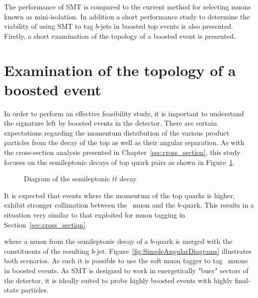 The performance of SMT is compared to the current method for selecting muons known as mini-isolation. In addition a short performance study to determine the viability of using SMT to tag $b$-jets in boosted top events is also presented. Firstly, a short examination of the topology of a boosted event is presented.

\section{Examination of the topology of a boosted event}

In order to perform an effective feasibility study, it is important to understand the signature left by boosted events in the detector. There are certain expectations regarding the momentum distribution of the various product particles from the decay of the top as well as their angular separation. As with the cross-section analysis presented in Chapter~\ref{sec:cross_section}, this study focuses on the semileptonic decays of top quark pairs as shown in Figure~\ref{fig:BoostedSemileptonicDiagram}.

\begin{figure}
\caption{Diagram of the semileptonic $t\overline{t}$ decay} \label{fig:BoostedSemileptonicDiagram}
\end{figure}

It is expected that events where the momentum of the top quarks is higher, exhibit stronger collimation between the \W\ muon and the $b$-quark. This results in a situation very similar to that exploited for muon tagging in Section~\ref{sec:cross_section}.

where a muon from the semileptonic decay of a $b$-quark is merged with the constituents of the resulting $b$-jet. Figure~\ref{fig:SimpleAngularDiagrams}  illustrates both scenarios. As such it is possible to use the soft muon tagger to tag \W\ muons in boosted events. As SMT is designed to work in energetically "busy" sectors of the detector, it is ideally suited to probe highly boosted events with highly final-state particles.

